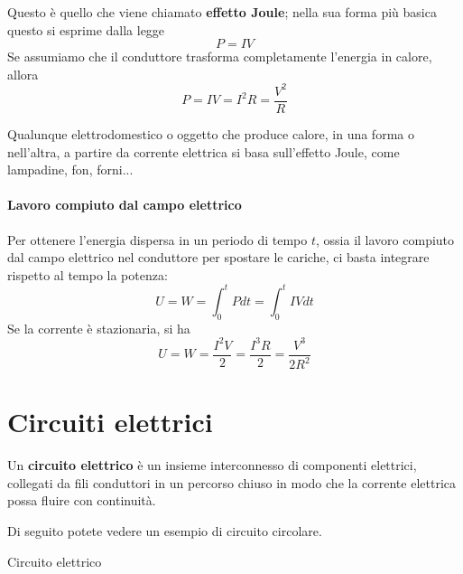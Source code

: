 Questo è quello che viene chiamato \textbf{effetto Joule}; nella sua forma più basica questo si esprime dalla legge
\begin{equation}
	P=IV
\end{equation}
Se assumiamo che il conduttore trasforma completamente l'energia in calore, allora
\begin{equation}
	P=IV=I^2R=\frac{V^2}{R}
\end{equation}
\begin{example}
	Qualunque elettrodomestico o oggetto che produce calore, in una forma o nell'altra, a partire da corrente elettrica si basa sull'effetto Joule, come lampadine, fon, forni...
\end{example}
\paragraph{Lavoro compiuto dal campo elettrico}
Per ottenere l'energia dispersa in un periodo di tempo $t$, ossia il lavoro compiuto dal campo elettrico nel conduttore per spostare le cariche, ci basta integrare rispetto al tempo la potenza:
\begin{equation}
	U=W=\int_{0}^{t}Pdt=\int_{0}^t IVdt
\end{equation}
Se la corrente è stazionaria, si ha
\begin{equation}%
	U=W=\frac{I^2V}{2}=\frac{I^3R}{2}=\frac{V^3}{2R^2}
\end{equation}
\section{Circuiti elettrici}
\begin{define}
	Un \textbf{circuito elettrico} è un insieme interconnesso di componenti elettrici, collegati da fili conduttori in un percorso chiuso in modo che la corrente elettrica possa fluire con continuità.
\end{define}
Di seguito potete vedere un esempio di circuito circolare.
\begin{center}
	\begin{frame}{Circuito elettrico}
	\end{frame}
\end{center}